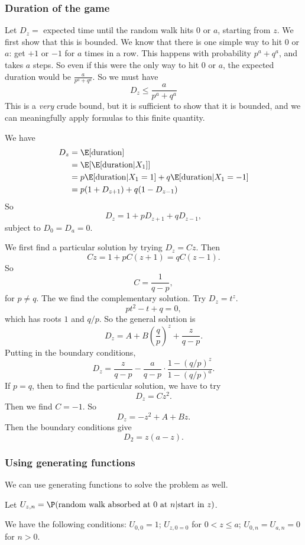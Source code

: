 \documentclass[a4paper]{article}
\begin{document}
\subsubsection*{Duration of the game}
Let $D_z =$ expected time until the random walk hits $0$ or $a$, starting from $z$. We first show that this is bounded. We know that there is one simple way to hit $0$ or $a$: get $+1$ or $-1$ for $a$ times in a row. This happens with probability $p^a + q^a$, and takes $a$ steps. So even if this were the only way to hit $0$ or $a$, the expected duration would be $\frac{a}{p^a + q^a}$. So we must have
\[
  D_z \leq \frac{a}{p^a + q^a}
\]
This is a \emph{very} crude bound, but it is sufficient to show that it is bounded, and we can meaningfully apply formulas to this finite quantity.

We have
\begin{align*}
  D_z &= \E[\text{duration}]\\
  &= \E[\E[\text{duration}|X_1]]\\
  &= p\E[\text{duration}|X_1 = 1] + q\E[\text{duration}|X_1 = -1]\\
  &= p(1 + D_{z + 1}) + q(1 - D_{z - 1})\\
\end{align*}
So
\[
  D_z = 1 + pD_{z + 1} + qD_{z - 1},
\]
subject to $D_0 = D_a = 0$.

We first find a particular solution by trying $D_z = Cz$. Then
\[
  Cz = 1 + pC(z + 1) = qC(z - 1).
\]
So
\[
  C = \frac{1}{q - p},
\]
for $p \not = q$. The we find the complementary solution. Try $D_z = t^z$.
\[
  pt^2 - t + q = 0,
\]
which has roots $1$ and $q/p$. So the general solution is
\[
  D_z = A + B\left(\frac{q}{p}\right)^z + \frac{z}{q - p}.
\]
Putting in the boundary conditions,
\[
  D_z = \frac{z}{q - p} - \frac{a}{q - p} \cdot \frac{1 - (q/p)^z}{1 - (q/p)^a}.
\]
If $p = q$, then to find the particular solution, we have to try
\[
  D_z = Cz^2.
\]
Then we find $C = -1$. So
\[
  D_z = -z^2 + A + Bz.
\]
Then the boundary conditions give
\[
  D_2 = z(a - z).
\]
\subsubsection*{Using generating functions}
We can use generating functions to solve the problem as well.

Let $U_{z,n} = \P(\text{random walk absorbed at 0 at }n|\text{start in }z)$.

We have the following conditions: $U_{0, 0} = 1$; $U_{z, 0 = 0}$ for $0 < z \leq a$; $U_{0, n} = U_{a, n} = 0$ for $n > 0$.
\end{document}
